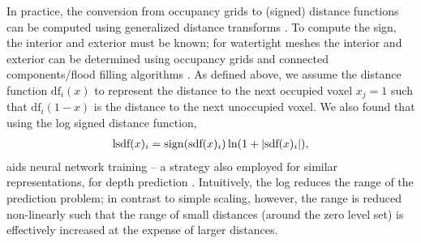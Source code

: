 In practice, the conversion from occupancy grids to (signed) distance
functions can be computed using generalized distance transforms
\cite{FelzenswalbHuttenlocher:2012}. To compute the sign,
the interior and exterior must be known; for watertight meshes
the interior and exterior can be determined using occupancy grids
and connected components/flood filling algorithms \cite[Section~3.4]{Szeliski:2011}.
As defined above, we assume the distance function
$\text{df}_i(x)$ to represent the distance to the next occupied voxel $x_j = 1$
such that $\text{df}_i(1 - x)$ is the distance to the next unoccupied voxel.
We also found that using the log signed distance function, \ie
\begin{align}
  \text{lsdf}(x)_i = \operatorname{sign}(\text{sdf}(x)_i) \ln(1 + |\text{sdf}(x)_i|),
\end{align}
aids neural network training -- a strategy also employed for similar representations,
\eg for depth prediction \cite{EigenFergus:2015,EigenFergus:2014,LainaRupprechtNavab:2016}.
Intuitively, the log reduces the range of the prediction problem; in contrast to simple scaling,
however, the range is reduced non-linearly such that the range of small distances (\ie around
the zero level set) is effectively increased at the expense of larger distances.


